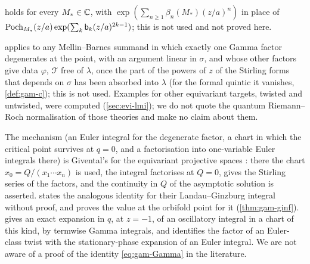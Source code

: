 \begin{rmk}
\label{rmk:gam-Mcomplex}
 holds for every $M_*\in\mathbb{C}$, with $\exp(\sum_{n\geq 1}\beta_n(M_*)(z/a)^n)$ in place of $\mathrm{Poch}_{M_*}(z/a)\exp(\sum_k\mathsf{b}_k(z/a)^{2k-1})$; this is not used and not proved here. 
\end{rmk}

\begin{rmk}[Generality]
\label{rmk:gam-general}
 applies to any Mellin--Barnes summand in which exactly one Gamma factor degenerates at the point, with an argument linear in $\sigma$, and whose other factors give data $\varphi$, $\mathcal{F}$ free of $\lambda$, once the part of the powers of $z$ of the Stirling forms that depends on $\sigma$ has been absorbed into $\lambda$ (for the formal quintic it vanishes, \cref{def:gam-c}); this is not used. Examples for other equivariant targets, twisted and untwisted, were computed (\cref{sec:evi-lmi}); we do not quote the quantum Riemann--Roch normalisation of those theories and make no claim about them.
\end{rmk}

\begin{rmk}
\label{rmk:gam-prior}
The mechanism (an Euler integral for the degenerate factor, a chart in which the critical point survives at $q=0$, and a factorisation into one-variable Euler integrals there) is Givental's for the equivariant projective spaces \cite[\S10]{MR1901075}: there the chart $x_0=Q/(x_1\cdots x_n)$ is used, the integral factorises at $Q=0$, \cite[10.4~Lemma]{MR1901075} gives the Stirling series of the factors, and the continuity in $Q$ of the asymptotic solution is asserted.  \cite[Remark~7.2]{GJR18} states the analogous identity for their Landau--Ginzburg integral without proof, and \cite[Lemma~7.7, (37)]{GJR18} proves the value at the orbifold point for it (\cref{thm:gam-ginf}). \cite[Lemma~4.20]{MR2553377} gives an exact expansion in $q$, at $z=-1$, of an oscillatory integral in a chart of this kind, by termwise Gamma integrals, and \cite[\S7, (11)]{MR2276766} identifies the factor of an Euler-class twist with the stationary-phase expansion of an Euler integral. We are not aware of a proof of the identity \eqref{eq:gam-Gamma} in the literature.
\end{rmk}
